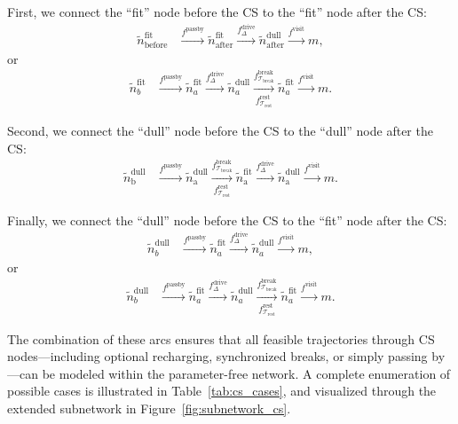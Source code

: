 \documentclass[trsc,dblanonrev]{informs4}
\begin{document}
First, we connect the ``fit'' node before the CS to the ``fit'' node after the CS:
\begin{align*}
\tilde{n}^{\text{fit}}_{\text{before}} &\xrightarrow{f^{\text{passby}}} \tilde{n}^{\text{fit}}_{\text{after}}
\xrightarrow{f^{\text{drive}}_{\Delta}} \tilde{n}^{\text{dull}}_{\text{after}}
\xrightarrow{f^{\text{visit}}} m,
\end{align*}
or
\begin{align*}
\tilde{n}^{\text{fit}}_{b}
&\xrightarrow{f^{\text{passby}}}
\tilde{n}^{\text{fit}}_{a}
\xrightarrow{f^{\text{drive}}_{\Delta}}
\tilde{n}^{\text{dull}}_{a}
\xrightarrow[
  f^{\text{rest}}_{\mathcal{T}_{\text{rest}}}
]{
  f^{\text{break}}_{\mathcal{T}_{\text{break}}}
}
\tilde{n}^{\text{fit}}_{a}
\xrightarrow{f^{\text{visit}}}
m.
\end{align*}

Second, we connect the ``dull'' node before the CS to the ``dull'' node after the CS:
\begin{align*}
\tilde{n}^{\text{dull}}_{\text{b}} &\xrightarrow{f^{\text{passby}}} \tilde{n}^{\text{dull}}_{\text{a}}
\xrightarrow[
  f^{\text{rest}}_{\mathcal{T}_{\text{rest}}}
]{
  f^{\text{break}}_{\mathcal{T}_{\text{break}}}
}
\tilde{n}^{\text{fit}}_{\text{a}}
\xrightarrow{f^{\text{drive}}_{\Delta}} \tilde{n}^{\text{dull}}_{\text{a}}
\xrightarrow{f^{\text{visit}}} m.
\end{align*}

Finally, we connect the ``dull'' node before the CS to the ``fit'' node after the CS:
\begin{align*}
\tilde{n}^{\text{dull}}_{b}
&\xrightarrow{f^{\text{passby}}}
\tilde{n}^{\text{fit}}_{a}
\xrightarrow{f^{\text{drive}}_{\Delta}}
\tilde{n}^{\text{dull}}_{a}
\xrightarrow{f^{\text{visit}}}
m,
\end{align*}
or
\begin{align*}
\tilde{n}^{\text{dull}}_{b}
&\xrightarrow{f^{\text{passby}}}
\tilde{n}^{\text{fit}}_{a}
\xrightarrow{f^{\text{drive}}_{\Delta}}
\tilde{n}^{\text{dull}}_{a}
\xrightarrow[
  f^{\text{rest}}_{\mathcal{T}_{\text{rest}}}
]{
  f^{\text{break}}_{\mathcal{T}_{\text{break}}}
}
\tilde{n}^{\text{fit}}_{a}
\xrightarrow{f^{\text{visit}}}
m.
\end{align*}


The combination of these arcs ensures that all feasible trajectories through CS nodes—including optional recharging, synchronized breaks, or simply passing by—can be modeled within the parameter-free network. A complete enumeration of possible cases is illustrated in Table~\ref{tab:cs_cases}, and visualized through the extended subnetwork in Figure~\ref{fig:subnetwork_cs}.
\end{document}
